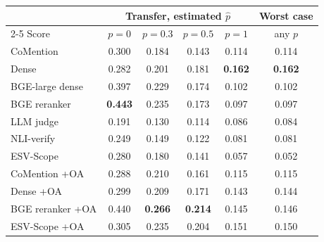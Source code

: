 \setlength{\tabcolsep}{3pt}
\begin{tabular}{lccccc}
\toprule
 & \multicolumn{4}{c}{Transfer, estimated $\hat p$} & Worst case \\
\cmidrule(lr){2-5}
Score & $p=0$ & $p=0.3$ & $p=0.5$ & $p=1$ & any $p$ \\
\midrule
CoMention & 0.300 & 0.184 & 0.143 & 0.114 & 0.114 \\
Dense & 0.282 & 0.201 & 0.181 & \textbf{0.162} & \textbf{0.162} \\
BGE-large dense & 0.397 & 0.229 & 0.174 & 0.102 & 0.102 \\
BGE reranker & \textbf{0.443} & 0.235 & 0.173 & 0.097 & 0.097 \\
LLM judge & 0.191 & 0.130 & 0.114 & 0.086 & 0.084 \\
NLI-verify & 0.249 & 0.149 & 0.122 & 0.081 & 0.081 \\
ESV-Scope & 0.280 & 0.180 & 0.141 & 0.057 & 0.052 \\
\midrule
CoMention +OA & 0.288 & 0.210 & 0.161 & 0.115 & 0.115 \\
Dense +OA & 0.299 & 0.209 & 0.171 & 0.143 & 0.144 \\
BGE reranker +OA & 0.440 & \textbf{0.266} & \textbf{0.214} & 0.145 & 0.146 \\
ESV-Scope +OA & 0.305 & 0.235 & 0.204 & 0.151 & 0.150 \\
\bottomrule
\end{tabular}
